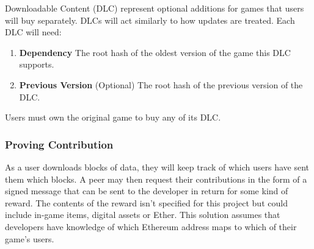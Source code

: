 Downloadable Content (DLC)  represent optional additions for games that users will buy separately. DLCs will act similarly to how updates are treated. Each DLC will need:

\begin{enumerate}
  \item \textbf{Dependency} The root hash of the oldest version of the game this DLC supports.
  \item \textbf{Previous Version} (Optional) The root hash of the previous version of the DLC.
\end{enumerate}

\newparagraph
Users must own the original game to buy any of its DLC. 

\subsubsection*{Proving Contribution}

As a user downloads blocks of data, they will keep track of which users have sent them which blocks. A peer may then request their contributions in the form of a signed message that can be sent to the developer  in return for some kind of reward. The contents of the reward isn't specified for this project but could include in-game items, digital assets or Ether. This solution assumes that developers have knowledge of which Ethereum address maps to which of their game's users.